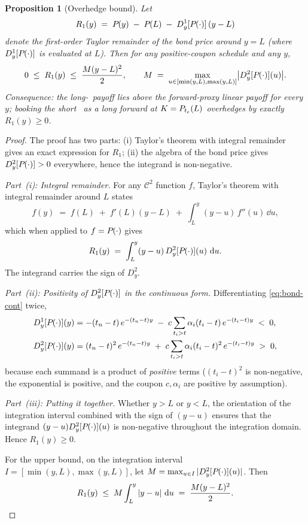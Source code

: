 \documentclass[11pt,a4paper]{article}
\newcommand{\Tlock}{\text{T-Lock}}
\newcommand{\dD}[1]{D_{y}^{#1}}
\newtheorem{proposition}{Proposition}
\begin{document}
\begin{proposition}[Overhedge bound]\label{prop:overhedge}
Let
\begin{equation}\label{eq:R1-def}
  R_1(y) \;=\; \Bond{}{y} \;-\; \Bond{}{L} \;-\; \dD{1}[\Bond{}{\cdot}]\,(y - L)
\end{equation}
denote the first-order Taylor remainder of the bond price around
$y=L$ (where $\dD{1}[\Bond{}{\cdot}]$ is evaluated at $L$). Then for
any positive-coupon schedule and any $y$,
\begin{equation}\label{eq:rem-bound}
  0 \;\le\; R_1(y) \;\le\; \frac{M(y-L)^2}{2},
  \qquad
  M \;=\; \max_{u \in [\min(y,L),\max(y,L)]} \bigl| \dD{2}[\Bond{}{\cdot}](u) \bigr|.
\end{equation}
\textit{Consequence:} the long-\Tlock\ payoff lies above the
forward-proxy linear payoff for every $y$; booking the short
\Tlock\ as a long forward at $K = P_{t_e}(L)$ overhedges by
exactly $R_1(y) \ge 0$.
\end{proposition}

\begin{proof}
The proof has two parts: (i) Taylor's theorem with integral remainder
gives an exact expression for $R_1$; (ii) the algebra of the bond price
gives $\dD{2}[\Bond{}{\cdot}] > 0$ everywhere, hence the integrand is
non-negative.

\medskip\noindent
\emph{Part~(i): Integral remainder.}
For any $\mathcal{C}^2$ function $f$, Taylor's theorem with integral
remainder around $L$ states
\[
  f(y) \;=\; f(L) \;+\; f'(L)(y-L) \;+\; \int_L^y (y-u)\, f''(u)\, \dd u,
\]
which when applied to $f = P_{}(\cdot)$ gives
\begin{equation}\label{eq:taylor-int}
  R_1(y) \;=\; \int_L^y (y - u)\, \dD{2}[\Bond{}{\cdot}](u)\, \dd u.
\end{equation}
The integrand carries the sign of $\dD{2}$.

\medskip\noindent
\emph{Part~(ii): Positivity of $\dD{2}[\Bond{}{\cdot}]$ in the
continuous form.}
Differentiating \eqref{eq:bond-cont} twice,
\begin{align*}
  \dD{1}[\Bond{}{\cdot}](y)
    &= -(t_n - t)\, e^{-(t_n-t)y}\;-\; c\sum_{t_i > t} \alpha_i (t_i - t)\, e^{-(t_i-t)y} \;<\; 0, \\
  \dD{2}[\Bond{}{\cdot}](y)
    &= (t_n - t)^2\, e^{-(t_n-t)y}\;+\; c\sum_{t_i > t} \alpha_i (t_i - t)^2\, e^{-(t_i-t)y} \;>\; 0,
\end{align*}
because each summand is a product of \emph{positive} terms
($(t_i-t)^2$ is non-negative, the exponential is positive, and the
coupon $c, \alpha_i$ are positive by assumption).

\medskip\noindent
\emph{Part~(iii): Putting it together.}
Whether $y > L$ or $y < L$, the orientation of the integration
interval combined with the sign of $(y - u)$ ensures that the
integrand $(y-u) \dD{2}[\Bond{}{\cdot}](u)$ is non-negative throughout
the integration domain. Hence $R_1(y) \ge 0$.

For the upper bound, on the integration interval
$I = [\min(y, L), \max(y, L)]$, let
$M = \max_{u \in I} |\dD{2}[\Bond{}{\cdot}](u)|$. Then
\[
  R_1(y) \;\le\; M \int_L^y |y - u|\, \,\mathrm{d} u \;=\; \frac{M (y-L)^2}{2}.
  \qedhere
\]
\end{proof}
\end{document}
